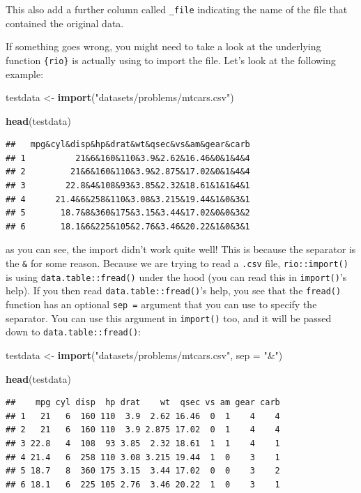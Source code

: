 \documentclass[]{gitbook}
\newenvironment{Shaded}{\begin{snugshade}}{\end{snugshade}}
\newcommand{\DataTypeTok}[1]{\textcolor[rgb]{0.13,0.29,0.53}{#1}}
\newcommand{\KeywordTok}[1]{\textcolor[rgb]{0.13,0.29,0.53}{\textbf{#1}}}
\newcommand{\NormalTok}[1]{#1}
\newcommand{\StringTok}[1]{\textcolor[rgb]{0.31,0.60,0.02}{#1}}
\begin{document}
This also add a further column called \texttt{\_file} indicating the name of the file that contained the
original data.

If something goes wrong, you might need to take a look at the underlying function \texttt{\{rio\}} is
actually using to import the file. Let's look at the following example:

\begin{Shaded}
\begin{Highlighting}[]
\NormalTok{testdata <-}\StringTok{ }\KeywordTok{import}\NormalTok{(}\StringTok{"datasets/problems/mtcars.csv"}\NormalTok{)}

\KeywordTok{head}\NormalTok{(testdata)}
\end{Highlighting}
\end{Shaded}

\begin{verbatim}
##   mpg&cyl&disp&hp&drat&wt&qsec&vs&am&gear&carb
## 1          21&6&160&110&3.9&2.62&16.46&0&1&4&4
## 2         21&6&160&110&3.9&2.875&17.02&0&1&4&4
## 3        22.8&4&108&93&3.85&2.32&18.61&1&1&4&1
## 4      21.4&6&258&110&3.08&3.215&19.44&1&0&3&1
## 5       18.7&8&360&175&3.15&3.44&17.02&0&0&3&2
## 6       18.1&6&225&105&2.76&3.46&20.22&1&0&3&1
\end{verbatim}

as you can see, the import didn't work quite well! This is because the separator is the \texttt{\&} for
some reason. Because we are trying to read a \texttt{.csv} file, \texttt{rio::import()} is using
\texttt{data.table::fread()} under the hood (you can read this in \texttt{import()}'s help). If you then read
\texttt{data.table::fread()}'s help, you see that the \texttt{fread()} function has an optional \texttt{sep\ =} argument
that you can use to specify the separator. You can use this argument in \texttt{import()} too, and it will
be passed down to \texttt{data.table::fread()}:

\begin{Shaded}
\begin{Highlighting}[]
\NormalTok{testdata <-}\StringTok{ }\KeywordTok{import}\NormalTok{(}\StringTok{"datasets/problems/mtcars.csv"}\NormalTok{, }\DataTypeTok{sep =} \StringTok{"&"}\NormalTok{)}

\KeywordTok{head}\NormalTok{(testdata)}
\end{Highlighting}
\end{Shaded}

\begin{verbatim}
##    mpg cyl disp  hp drat    wt  qsec vs am gear carb
## 1   21   6  160 110  3.9  2.62 16.46  0  1    4    4
## 2   21   6  160 110  3.9 2.875 17.02  0  1    4    4
## 3 22.8   4  108  93 3.85  2.32 18.61  1  1    4    1
## 4 21.4   6  258 110 3.08 3.215 19.44  1  0    3    1
## 5 18.7   8  360 175 3.15  3.44 17.02  0  0    3    2
## 6 18.1   6  225 105 2.76  3.46 20.22  1  0    3    1
\end{verbatim}
\end{document}
